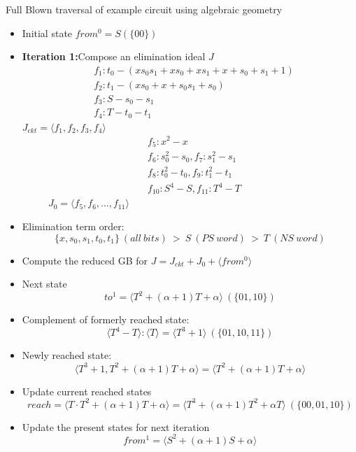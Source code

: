 \documentclass[xcolor=dvipsnames]{beamer}
\newcommand{\bi}{\begin{itemize}}
\newcommand{\ei}{\end{itemize}}
\begin{document}
\begin{frame}{\large{Full Blown traversal of example circuit using algebraic geometry}}
\bi
\item Initial state $from^0 = S(\{00\})$
\item {\bf Iteration 1:}Compose an elimination ideal $J$ 
\vspace{-0.2in}\\
\begin{align*}
&f_1: t_0- (xs_0s_1+xs_0+xs_1+x+s_0+s_1+1)\\
&f_2: t_1 - (xs_0+x+s_0s_1+s_0)\\
&f_3: S - s_0 - s_1\\
&f_4: T - t_0 - t_1
\end{align*}
$J_{ckt} = \langle f_1,f_2,f_3,f_4\rangle$
\begin{align*}
&f_5: x^2-x\\
&f_6: s_0^2-s_0, f_7: s_1^2-s_1\\
&f_8: t_0^2-t_0, f_9: t_1^2-t_1\\
&f_{10}: S^4-S, f_{11}:T^4-T
\end{align*}
$\ \ \ \ \ \ \ \ \ \ \  \ J_0 = \langle f_5,f_6,\dots,f_{11}\rangle$
\ei
\end{frame}
\begin{frame}[label = pptpage2]
\bi
\item Elimination term order: 
$$\{x,s_0,s_1,t_0,t_1\}~(all~bits)~>~S~(PS~word)~ >~ T~(NS~word)$$
\item Compute the reduced GB for $J = J_{ckt}+J_0+\langle from^0\rangle$
\item Next state 
$$to^1 = \langle T^2+(\alpha+1)T+\alpha\rangle~(\{01,10\})$$
\item Complement of formerly reached state:
$$\langle T^4-T\rangle:\langle T\rangle = \langle T^3+1\rangle ~(\{01,10,11\})$$
\item Newly reached state:
$$\langle T^3+1, T^2+(\alpha+1)T+\alpha \rangle = \langle T^2+(\alpha+1)T+\alpha \rangle$$ 
\item Update current reached states 
$$reach = \langle T\cdot T^2+(\alpha+1)T+\alpha \rangle = \langle T^3+(\alpha+1)T^2+\alpha T\rangle~(\{00,01,10\})$$
\item Update the present states for next iteration
$$from^1 = \langle S^2+(\alpha+1)S+\alpha\rangle$$
\ei
\hyperlink{pptalg}{}
\end{frame}
\end{document}
